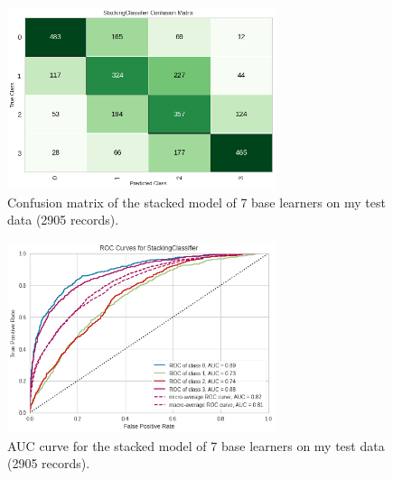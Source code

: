 \documentclass[11pt]{article}
\begin{document}
\begin{figure}[h]
  \caption{Confusion matrix of the stacked model of 7 base learners on my test data (2905 records).}
  \label{confusionmatrix}
  \centering
  \includegraphics[width=0.7\textwidth]{../img/confusionmatrix.png}
\end{figure}

\begin{figure}[H]
  \caption{AUC curve for the stacked model of 7 base learners on my test data (2905 records).}
  \label{auc}
  \centering
  \includegraphics[width=0.7\textwidth]{../img/auc.png}
\end{figure}




\end{document}
